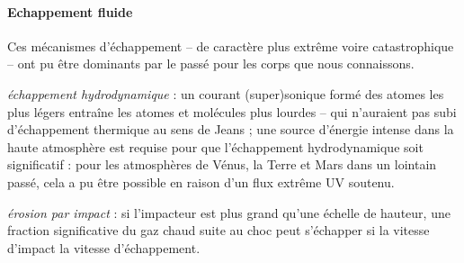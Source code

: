 \paragraph{Echappement fluide} Ces mécanismes d'échappement -- de caractère plus extrême voire catastrophique -- ont pu être dominants par le passé pour les corps que nous connaissons.
\begin{description}
\item{\emph{échappement hydrodynamique}} : un courant (super)sonique formé des atomes les plus légers entraîne les atomes et molécules plus lourdes -- qui n'auraient pas subi d'échappement thermique au sens de Jeans ; une source d'énergie intense dans la haute atmosphère est requise pour que l'échappement hydrodynamique soit significatif : pour les atmosphères de Vénus, la Terre et Mars dans un lointain passé, cela a pu être possible en raison d'un flux extrême UV soutenu.
\item{\emph{érosion par impact}} : si l'impacteur est plus grand qu'une échelle de hauteur, une fraction significative du gaz chaud suite au choc peut s'échapper si la vitesse d'impact la vitesse d'échappement.
\end{description}


